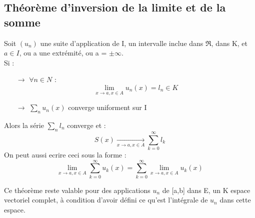 \subsection{Théorème d'inversion de la limite et de la somme}
\begin{theo}
Soit $(u_n)$ une suite d'application de I, un intervalle inclue dans $\Re$, dans K, et $a\in I$, ou a une extrémité, ou a = $\pm \infty$.\\
Si :\\
\begin{itemize}
 \item[$\rightarrow$] $\forall n \in N$ : 
$$\lim_{x \rightarrow a,x\in A} u_n(x) = l_n \in K$$
 \item[$\rightarrow$] $\underset{n} \sum u_n(x)$ converge uniforment sur I\\
\end{itemize}
Alors la série $\underset{n} \sum l_n$ converge et : 
$$S(x) \underset{x\rightarrow a,x\in A}\rightarrow \sum_{k=0}^{\infty} l_k$$
On peut aussi ecrire ceci sous la forme : 
$$\lim_{x \rightarrow a,x\in A} \sum_{k=0}^{\infty}u_k(x) = \sum_{k=0}^{\infty}\lim_{x \rightarrow a,x\in A} u_k(x)$$
\end{theo}
\begin{gene}
Ce théorème reste valable pour des applications $u_n$ de [a,b] dans E, un K espace vectoriel complet, à condition d'avoir défini ce qu'est l'intégrale de $u_n$ dans cette espace.
\end{gene}
